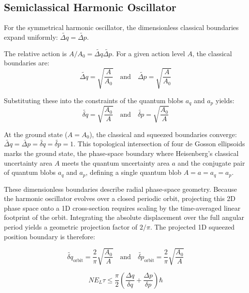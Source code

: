\documentclass[%
  aps, reprint, prl, amsmath,amssymb
]{revtex4-2}
\begin{document}
\subsection{Semiclassical Harmonic Oscillator}

For the symmetrical harmonic oscillator, the dimensionless classical boundaries expand uniformly: $\widetilde{\Delta q} = \widetilde{\Delta p}$.

The relative action is $A/A_0 = \widetilde{\Delta q} \widetilde{\Delta p}$. For a given action level $A$, the classical boundaries are:
\begin{equation}
\widetilde{\Delta q} = \sqrt{\frac{A}{A_0}} \quad \text{and} \quad \widetilde{\Delta p} = \sqrt{\frac{A}{A_0}}
\end{equation}

Substituting these into the constraints of the quantum blobs $a_q$ and $a_p$ yields:
\begin{equation}
\widetilde{\delta q} = \sqrt{\frac{A_0}{A}} \quad \text{and} \quad \widetilde{\delta p} = \sqrt{\frac{A_0}{A}}
\end{equation}

At the ground state ($A = A_0$), the classical and squeezed boundaries converge: $\widetilde{\Delta q} = \widetilde{\Delta p} = \widetilde{\delta q} = \widetilde{\delta p} = 1$. This topological intersection of four de Gosson ellipsoids marks the ground state, the phase-space boundary where Heisenberg's classical uncertainty area $A$ meets the quantum uncertainty area $a$ and the conjugate pair of quantum blobs $a_q$ and $a_p$, defining a single quantum blob $A=a=a_q=a_p$.

These dimensionless boundaries describe radial phase-space geometry. Because the harmonic oscillator evolves over a closed periodic orbit, projecting this 2D phase space onto a 1D cross-section requires scaling by the time-averaged linear footprint of the orbit. Integrating the absolute displacement over the full angular period yields a geometric projection factor of $2/\pi$. The projected 1D squeezed position boundary is therefore:

\begin{equation}
\widetilde{\delta q}_{\text{orbit}} = \frac{2}{\pi} \sqrt{\frac{A_0}{A}}
\quad \text{and} \quad
\widetilde{\delta p}_{\text{orbit}} = \frac{2}{\pi} \sqrt{\frac{A_0}{A}}
\end{equation}


\begin{equation}
\label{eq:EllipticalToLinearHero}
N E_L \tau \le \frac{\pi}{2} \left( \frac{\Delta q}{\delta q} + \frac{\Delta p}{\delta p} \right)\hbar
\end{equation}
\end{document}

